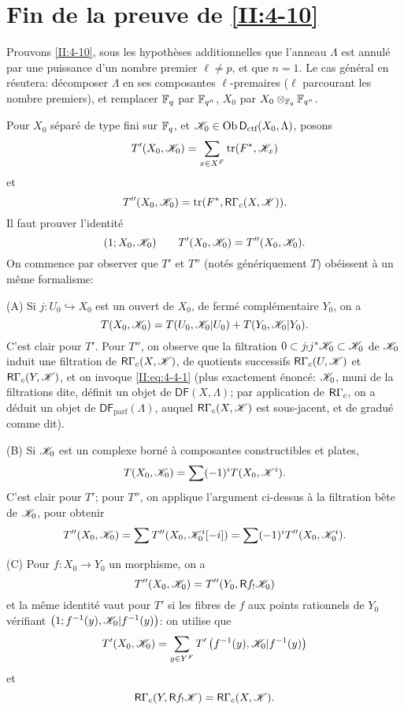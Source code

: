 \documentclass[oneside]{book}
\begin{document}
\section{Fin de la preuve de \ref{II:4-10}}\label{II:6}

Prouvons \ref{II:4-10}, sous les hypoth\`eses additionnelles que l'anneau 
$\Lambda$ est annul\'e par une puissance d'un nombre premier $\ell\ne p$, et 
que $n=1$. Le cas g\'en\'eral en r\'esutera: d\'ecomposer $\Lambda$ en ses 
composantes $\ell$-premaires ($\ell$ parcourant les nombre premiers), et 
remplacer $\mathbb{F}_q$ par $\mathbb{F}_{q^n}$, $X_0$ par $X_0\otimes_{\mathbb{F}_q}\mathbb{F}_{q^n}$. 

Pour $X_0$ s\'epar\'e de type fini sur $\mathbb{F}_q$, et 
$\mathscr{K}_0\in\operatorname{Ob}\mathsf{D}_\text{ctf}(X_0,\Lambda)$, posons 
\[
  T'(X_0,\mathscr{K}_0) = \sum_{x\in X^F} \operatorname{tr}(F^*,\mathscr{K}_x)
\]
et
\[
  T''(X_0,\mathscr{K}_0) = \operatorname{tr}(F^*,\mathsf{R}\Gamma_c(X,\mathscr{K})) \text{.}
\]
Il faut prouver l'identit\'e 
\[
  (1;X_0,\mathscr{K}_0) \qquad T'(X_0,\mathscr{K}_0) = T''(X_0,\mathscr{K}_0) \text{.}
\]
On commence par observer que $T'$ et $T''$ (not\'es g\'en\'eriquement $T$) 
ob\'eissent \`a un m\^eme formalisme:

(A) Si $j:U_0\hookrightarrow X_0$ est un ouvert de $X_0$, de ferm\'e 
compl\'ementaire $Y_0$, on a 
\[
  T(X_0,\mathscr{K}_0) = T(U_0,\mathscr{K}_0|U_0) + T(Y_0,\mathscr{K}_0|Y_0) \text{.}
\]
C'est clair pour $T'$. Pour $T''$, on observe que la filtration 
$0\subset j_! j^* \mathscr{K}_0\subset \mathscr{K}_0$ de $\mathscr{K}_0$ induit une filtration de 
$\mathsf{R}\Gamma_c(X,\mathscr{K})$, de quotients successifs $\mathsf{R}\Gamma_c(U,\mathscr{K})$ et 
$\mathsf{R}\Gamma_c(Y,\mathscr{K})$, et on invoque \eqref{II:eq:4-4-1} (plus exactement 
\'enonc\'e: $\mathscr{K}_0$, muni de la filtrations dite, d\'efinit un objet de 
$\mathsf{DF}(X,\Lambda)$; par application de $\mathsf{R}\Gamma_c$, on a d\'eduit un 
objet de $\mathsf{DF}_\text{parf}(\Lambda)$, auquel $\mathsf{R}\Gamma_c(X,\mathscr{K})$ est 
sous-jacent, et de gradu\'e comme dit). 

(B) Si $\mathscr{K}_0$ est un complexe born\'e \`a composantes constructibles et plates, 
\[
  T(X_0,\mathscr{K}_0) = \sum (-1)^i T(X_0,\mathscr{K}^i) \text{.}
\]
C'est clair pour $T'$; pour $T''$, on applique l'argument ci-dessus \`a la 
filtration b\^ete de $\mathscr{K}_0$, pour obtenir 
\[
  T''(X_0,\mathscr{K}_0) = \sum T''(X_0,\mathscr{K}_0^i[-i]) = \sum (-1)^i T''(X_0,\mathscr{K}_0^i) \text{.}
\]

(C) Pour $f:X_0\to Y_0$ un morphisme, on a 
\[
  T''(X_0,\mathscr{K}_0) = T''(Y_0,\mathsf{R} f_! \mathscr{K}_0)
\]
et la m\^eme identit\'e vaut pour $T'$ si les fibres de $f$ aux points 
rationnels de $Y_0$ v\'erifiant $\left(1;f^{-1}(y),\mathscr{K}_0|f^{-1}(y)\right)$: on 
utilise que 
\[
  T'(X_0,\mathscr{K}_0) = \sum_{y\in Y^F} T'\left(f^{-1}(y), \mathscr{K}_0|f^{-1}(y)\right)
\]
et 
\[
  \mathsf{R}\Gamma_c(Y, \mathsf{R} f_! \mathscr{K}) = \mathsf{R}\Gamma_c(X,\mathscr{K}) \text{.}
\]
\end{document}
